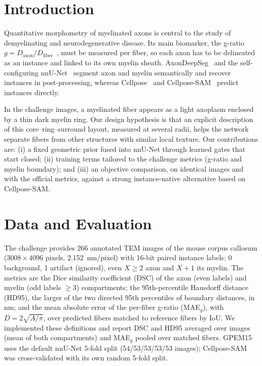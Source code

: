 \documentclass[journal]{IEEEtran}
\begin{document}
\section{Introduction}

Quantitative morphometry of myelinated axons is central to the study of
demyelinating and neurodegenerative disease. Its main biomarker, the g-ratio
$g = D_{\text{axon}}/D_{\text{fiber}}$~\cite{chomiak2009}, must be measured per
fiber, so each axon has to be delineated as an instance and linked to its own
myelin sheath. AxonDeepSeg~\cite{zaimi2018} and the self-configuring
nnU-Net~\cite{isensee2021} segment axon and myelin semantically and recover
instances in post-processing, whereas Cellpose~\cite{stringer2021} and
Cellpose-SAM~\cite{pachitariu2025} predict instances directly.

In the challenge images, a myelinated fiber appears as a light axoplasm
enclosed by a thin dark myelin ring. Our design hypothesis is that an explicit
description of this core--ring--surround layout, measured at several radii,
helps the network separate fibers from other structures with similar local
texture. Our contributions are: (i) a fixed geometric prior fused
into nnU-Net through learned gates that start closed; (ii) training terms
tailored to the challenge metrics (g-ratio and myelin boundary); and (iii) an
objective comparison, on identical images and with the official metrics,
against a strong instance-native alternative based on Cellpose-SAM.

\section{Data and Evaluation}

The challenge provides 266 annotated TEM images of the mouse corpus callosum
($3008\times4096$ pixels, 2.152~nm/pixel) with 16-bit paired instance labels:
0 background, 1 artifact (ignored), even $X\geq2$ axon and $X+1$ its myelin.
The metrics are the Dice similarity coefficient (DSC) of the axon (even labels)
and myelin (odd labels $\geq3$) compartments; the 95th-percentile Hausdorff
distance (HD95), the larger of the two directed 95th percentiles of
boundary distances, in nm; and the mean absolute error of the per-fiber
g-ratio (MAE$_g$), with $D=2\sqrt{A/\pi}$, over predicted fibers matched to
reference fibers by IoU. We implemented these definitions and report DSC and
HD95 averaged over images (mean of both compartments) and MAE$_g$ pooled over
matched fibers. GPEM15 uses the default nnU-Net 5-fold split (54/53/53/53/53
images); Cellpose-SAM was cross-validated with its own random 5-fold split.
\end{document}
